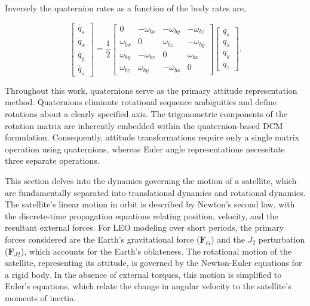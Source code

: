 \noindent Inversely the quaternion rates as a function of the body rates are,

\begin{equation}
    \begin{bmatrix}
        \dot{q_s} \\ \dot{q_x} \\ \dot{q_y} \\ \dot{q_z}
    \end{bmatrix}
    =
    \frac{1}{2}
    \begin{bmatrix}
        0 & -\omega_{bx} & -\omega_{by} & -\omega_{bz}\\
        \omega_{bx} & 0 & \omega_{bz} & -\omega_{by}\\
        \omega_{by} & -\omega_{bz} & 0 & \omega_{bx}\\
        \omega_{bz} & \omega_{by} & -\omega_{bx} & 0 
    \end{bmatrix}
    \begin{bmatrix}
        q_s \\ q_x \\ q_y \\ q_z
    \end{bmatrix}
    \text{.}
    \label{Eq:3.12}
\end{equation}

\noindent Throughout this work, quaternions serve as the primary attitude representation method. Quaternions eliminate rotational sequence 
ambiguities and define rotations about a clearly specified axis. The trigonometric components of the rotation matrix are inherently embedded 
within the quaternion-based DCM formulation. Consequently, attitude transformations require only a single matrix operation using quaternions, whereas 
Euler angle representations necessitate three separate operations.


\label{sec:dynamics}

This section delves into the dynamics governing the motion of a satellite, which are fundamentally separated into translational dynamics and rotational dynamics. The satellite's linear motion in orbit is described by Newton's second law, with the discrete-time propagation equations relating position, velocity, and the resultant external forces. For LEO modeling over short periods, the primary forces considered are the Earth's gravitational force ($\mathbf{F}_G$) and the $J_2$ perturbation ($\mathbf{F}_{J2}$), which accounts for the Earth's oblateness. The rotational motion of the satellite, representing its attitude, is governed by the Newton-Euler equations for a rigid body. In the absence of external torques, this motion is simplified to Euler's equations, which relate the change in angular velocity to the satellite's moments of inertia.

